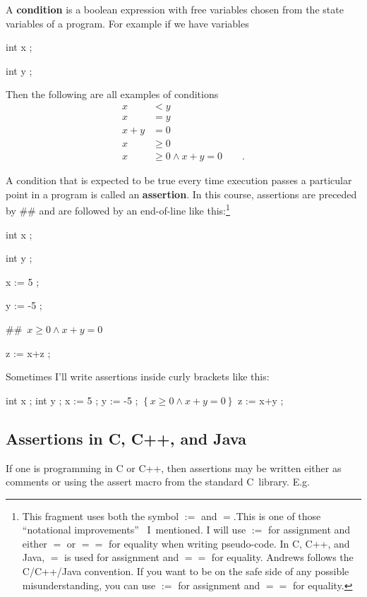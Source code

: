 \documentclass[11pt]{article}%
\begin{document}
A \textbf{condition} is a boolean expression with free variables chosen from
the state variables of a program. For example if we have variables

\begin{code}
int x ;

int y ;
\end{code}

Then the following are all examples of conditions%
\begin{align*}
x  &  <y\\
x  &  =y\\
x+y  &  =0\\
x  &  \geq0\\
x  &  \geq0\wedge x+y=0\qquad\text{.}%
\end{align*}


A condition that is expected to be true every time execution passes a
particular point in a program is called an \textbf{assertion}. In this course,
assertions are preceded by \#\# and are followed by an end-of-line like
this:\footnote{This fragment uses both the symbol $:=$ and $=$.This is one of
those \textquotedblleft notational improvements\textquotedblright%
\ I\ mentioned. I will use $:=$ for assignment and either $=$ or $==$ for
equality when writing pseudo-code. In C, C++, and Java, $=$ is used for
assignment and $==$ for equality. Andrews follows the C/C++/Java convention.
If you want to be on the safe side of any possible misunderstanding, you can
use $:=$ for assignment and $==$ for equality.}

\begin{code}
int x ;

int y ;

x := 5 ;

y := -5 ;

\#\#\ $x\geq0\wedge x+y=0$

z := x+z ;
\end{code}

Sometimes I'll write assertions inside curly brackets like this:

\begin{code}
int x ; int y ; x := 5 ; y := -5 ; $\left\{  x\geq0\wedge x+y=0\right\}  $ z
:= x+y ;
\end{code}

\subsection{Assertions in C, C++, and Java}

If one is programming in C or C++, then assertions may be written either as
comments or using the assert macro from the standard C\ library. E.g.
\end{document}
